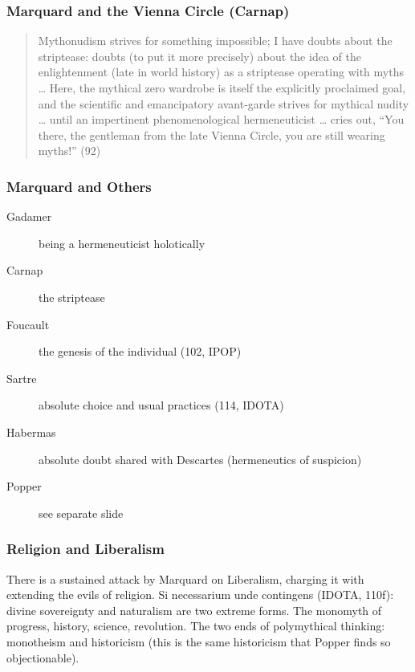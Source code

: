 \documentclass[xcolor=dvipsnames]{beamer}
\begin{document}
\begin{frame}
  \frametitle{Marquard and the Vienna Circle (Carnap)}
  \begin{quote}
    Mythonudism strives for something impossible; I have doubts about
    the striptease: doubts (to put it more precisely) about the idea
    of the enlightenment (late in world history) as a striptease
    operating with myths {\ldots} Here, the mythical zero wardrobe is
    itself the explicitly proclaimed goal, and the scientific and
    emancipatory avant-garde strives for mythical nudity {\ldots}
    until an impertinent phenomenological hermeneuticist {\ldots}
    cries out, ``You there, the gentleman from the late Vienna Circle,
    you are still wearing myths!'' (92)
  \end{quote}
\end{frame}

\begin{frame}
  \frametitle{Marquard and Others}
  \begin{description}
  \item[Gadamer] being a hermeneuticist holotically
  \item[Carnap] the striptease
  \item[Foucault] the genesis of the individual (102, IPOP)
  \item[Sartre] absolute choice and usual practices (114, IDOTA)
  \item[Habermas] absolute doubt shared with Descartes (hermeneutics
    of suspicion)
  \item[Popper] see separate slide
  \end{description}
\end{frame}

\begin{frame}
  \frametitle{Religion and Liberalism}
  There is a sustained attack by Marquard on Liberalism, charging it
  with extending the evils of religion. Si necessarium unde contingens
  (IDOTA, 110f): divine sovereignty and naturalism are two extreme
  forms. The monomyth of progress, history, science, revolution. The
  two ends of polymythical thinking: monotheism and historicism (this
  is the same historicism that Popper finds so objectionable). 
\end{frame}
\end{document}
